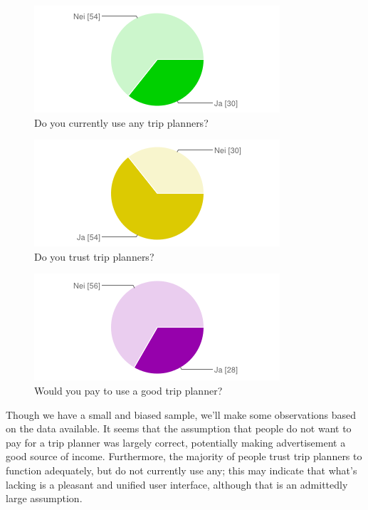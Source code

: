 \begin{figure}[!h]
    \centering
    \includegraphics[scale=0.5]{charts/benytter-du-deg-av-noen-reiseplanlegger.png}
    \caption{Do you currently use any trip planners?}
\end{figure}

\begin{figure}[!h]
    \centering
    \includegraphics[scale=0.5]{charts/stoler-du-paa-reiseplanleggere.png}
    \caption{Do you trust trip planners?}
\end{figure}

\begin{figure}[!h]
    \centering
    \includegraphics[scale=0.5]{charts/ville-du-betalt.png}
    \caption{Would you pay to use a good trip planner?}
\end{figure}

Though we have a small and biased sample, we'll make some observations based
on the data available. It seems that the assumption that people do not want to
pay for a trip planner was largely correct, potentially making advertisement a
good source of income. Furthermore, the majority of people trust trip planners
to function adequately, but do not currently use any; this may indicate that
what's lacking is a pleasant and unified user interface, although that is an
admittedly large assumption.

